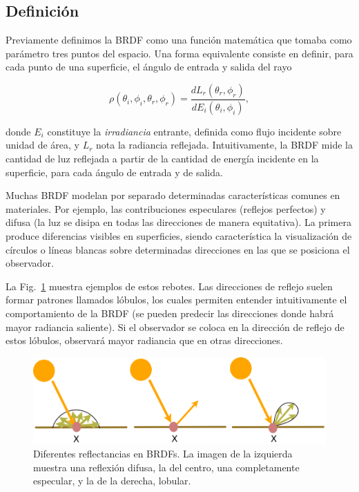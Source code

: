 \subsection{Definición}
Previamente definimos la BRDF como una función matemática que tomaba como parámetro tres puntos del espacio.
Una forma equivalente consiste en definir, para cada punto de una superficie, el ángulo de entrada y salida del rayo

$$\rho(\theta_{i},\phi_{i},\theta_{r},\phi_{r}) = \frac{dL_{r}(\theta_{r},\phi_{r})}{dE_{i}(\theta_{i},\phi_{i})},$$

\noindent donde $E_{i}$ constituye la {\em irradiancia} entrante, definida como flujo incidente sobre unidad de área, y $L_{r}$ nota la radiancia reflejada.
Intuitivamente, la BRDF mide la cantidad de luz reflejada a partir de la cantidad de energía incidente en la superficie, para cada ángulo de entrada y de salida.

Muchas BRDF modelan por separado determinadas características comunes en materiales.
Por ejemplo, las contribuciones especulares (reflejos perfectos) y difusa (la luz se disipa en todas las direcciones de manera equitativa).
La primera produce diferencias visibles en superficies, siendo característica la visualización de círculos o líneas blancas sobre determinadas direcciones en las que se posiciona el observador.

La Fig.~\ref{fg:contribuciones} muestra ejemplos de estos rebotes.
Las direcciones de reflejo suelen formar patrones llamados lóbulos, los cuales permiten entender intuitivamente el comportamiento de la BRDF (se pueden predecir las direcciones donde habrá mayor radiancia saliente).
Si el observador se coloca en la dirección de reflejo de estos lóbulos, observará mayor radiancia que en otras direcciones.

\begin{figure}
\center
\includegraphics[width=12cm]{figures/contribuciones}
\caption[Diferentes reflectancias en BRDFs]{Diferentes reflectancias en BRDFs. La imagen de la izquierda muestra una reflexión difusa, la del centro, una completamente especular, y la de la derecha, lobular.}
\label{fg:contribuciones}
\end{figure}

